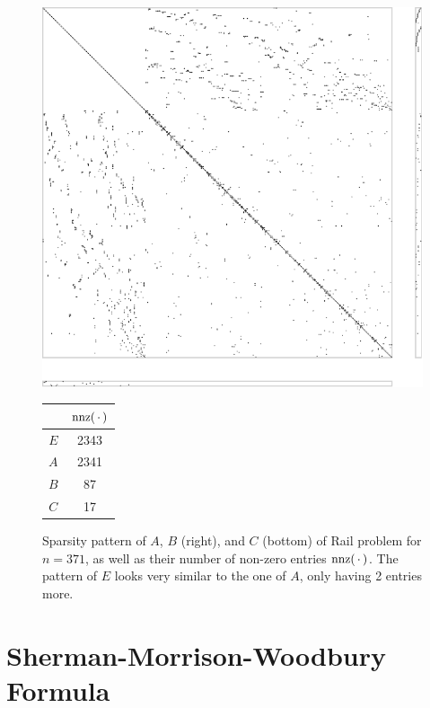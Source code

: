 \begin{figure}[t]
  \centering
  \begin{minipage}[c]{0.5\textwidth}
    \includegraphics[width=\textwidth]{figures/spy_ABC.pdf}
  \end{minipage}
  \begin{minipage}[c]{0.25\textwidth}
    \flushright
    \begin{tabular}{cS[table-format=4.0]}
      \toprule
      & {$\nnz(\optional{})$} \\
      \midrule
      $E$ & 2343 \\
      $A$ & 2341 \\
      $B$ & 87 \\
      $C$ & 17 \\
      \bottomrule
    \end{tabular}
  \end{minipage}
  \caption[Sparsity pattern of Rail problem]{%
    Sparsity pattern of $A$, $B$ (right), and $C$ (bottom) of Rail problem for $n=371$,
    as well as their number of non-zero entries $\nnz(\optional{})$.
    The pattern of $E$ looks very similar to the one of $A$, only having 2 entries more.
  }
  \label{fig:spy}
\end{figure}

\section{Sherman-Morrison-Woodbury Formula}
\label{sec:basics:smw}

